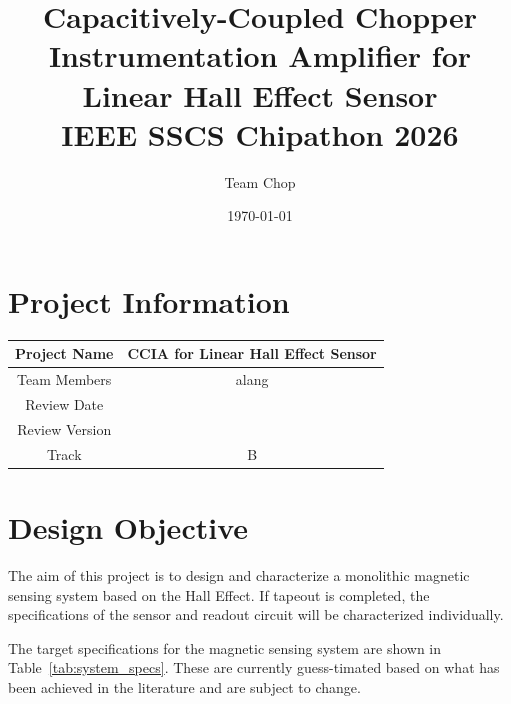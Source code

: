\documentclass{article}
\title{Capacitively-Coupled Chopper Instrumentation Amplifier for Linear Hall Effect Sensor \\[1ex] \large IEEE SSCS Chipathon 2026}
\author{Team Chop}
\date{\today}
\begin{document}
\maketitle

\newpage

\tableofcontents

\newpage

\section{Project Information}

\begin{center}
\begin{tabular}{|c c|} 
 \hline
 Project Name & CCIA for Linear Hall Effect Sensor \\
 \hline
 Team Members & alang \\ 
 \hline
 Review Date &  \\
 \hline
 Review Version &  \\
 \hline
 Track & B \\
 \hline
\end{tabular}
\end{center}

\newpage

\section{Design Objective}

The aim of this project is to design and characterize a monolithic magnetic sensing system based on the Hall Effect. 
If tapeout is completed, the specifications of the sensor and readout circuit will be characterized individually.

The target specifications for the magnetic sensing system are shown in Table~\ref{tab:system_specs}. 
These are currently guess-timated based on what has been achieved in the literature 
and are subject to change.
\end{document}
